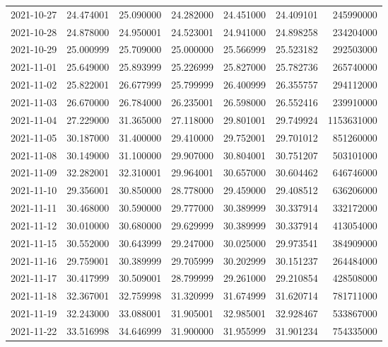 \begin{tabular}{lrrrrrr}
2021-10-27 &   24.474001 &   25.090000 &   24.282000 &   24.451000 &   24.409101 &   245990000 \\
2021-10-28 &   24.878000 &   24.950001 &   24.523001 &   24.941000 &   24.898258 &   234204000 \\
2021-10-29 &   25.000999 &   25.709000 &   25.000000 &   25.566999 &   25.523182 &   292503000 \\
2021-11-01 &   25.649000 &   25.893999 &   25.226999 &   25.827000 &   25.782736 &   265740000 \\
2021-11-02 &   25.822001 &   26.677999 &   25.799999 &   26.400999 &   26.355757 &   294112000 \\
2021-11-03 &   26.670000 &   26.784000 &   26.235001 &   26.598000 &   26.552416 &   239910000 \\
2021-11-04 &   27.229000 &   31.365000 &   27.118000 &   29.801001 &   29.749924 &  1153631000 \\
2021-11-05 &   30.187000 &   31.400000 &   29.410000 &   29.752001 &   29.701012 &   851260000 \\
2021-11-08 &   30.149000 &   31.100000 &   29.907000 &   30.804001 &   30.751207 &   503101000 \\
2021-11-09 &   32.282001 &   32.310001 &   29.964001 &   30.657000 &   30.604462 &   646746000 \\
2021-11-10 &   29.356001 &   30.850000 &   28.778000 &   29.459000 &   29.408512 &   636206000 \\
2021-11-11 &   30.468000 &   30.590000 &   29.777000 &   30.389999 &   30.337914 &   332172000 \\
2021-11-12 &   30.010000 &   30.680000 &   29.629999 &   30.389999 &   30.337914 &   413054000 \\
2021-11-15 &   30.552000 &   30.643999 &   29.247000 &   30.025000 &   29.973541 &   384909000 \\
2021-11-16 &   29.759001 &   30.389999 &   29.705999 &   30.202999 &   30.151237 &   264484000 \\
2021-11-17 &   30.417999 &   30.509001 &   28.799999 &   29.261000 &   29.210854 &   428508000 \\
2021-11-18 &   32.367001 &   32.759998 &   31.320999 &   31.674999 &   31.620714 &   781711000 \\
2021-11-19 &   32.243000 &   33.088001 &   31.905001 &   32.985001 &   32.928467 &   533867000 \\
2021-11-22 &   33.516998 &   34.646999 &   31.900000 &   31.955999 &   31.901234 &   754335000 \\

\end{tabular}
